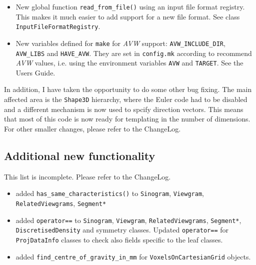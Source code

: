 \documentclass{article}
\begin{document}
\begin{itemize}
\item New global function \texttt{read\_from\_file()} using an input file format 
registry. This makes it much easier to add support for a new file format. See
class \texttt{InputFileFormatRegistry}.

\item New variables defined for \texttt{make} for \textit{AVW} support:
\texttt{AVW\_INCLUDE\_DIR}, \texttt{AVW\_LIBS} and \texttt{HAVE\_AVW}. They
are set in \texttt{config.mk} according to recommend \textit{AVW} values,
i.e. using the environment variables \texttt{AVW} and \texttt{TARGET}.
See the Users Guide.
\end{itemize}

In addition, I have taken the opportunity to do some other bug fixing.
The main affected area is the \texttt{Shape3D} hierarchy, where the 
Euler code had to be disabled and a different mechanism is now used to
spcify direction vectors. This means that most of this code is now
ready for templating in the number of dimensions. For other smaller
changes, please refer to the ChangeLog.

\subsection{Additional new functionality}
This list is incomplete. Please refer to the ChangeLog.
\begin{itemize}
\item added \texttt{has\_same\_characteristics()} to \texttt{Sinogram}, \texttt{Viewgram}, 
       \texttt{RelatedViewgrams}, \texttt{Segment*}
\item added \texttt{operator==} to \texttt{Sinogram}, \texttt{Viewgram}, 
       \texttt{RelatedViewgrams}, \texttt{Segment*}, \texttt{DiscretisedDensity} 
       and symmetry classes. Updated \texttt{operator==} for \texttt{ProjDataInfo}
       classes to check also fields specific to the leaf classes.
\item added \texttt{find\_centre\_of\_gravity\_in\_mm} for \texttt{VoxelsOnCartesianGrid} objects.
\end{itemize}
\end{document}
